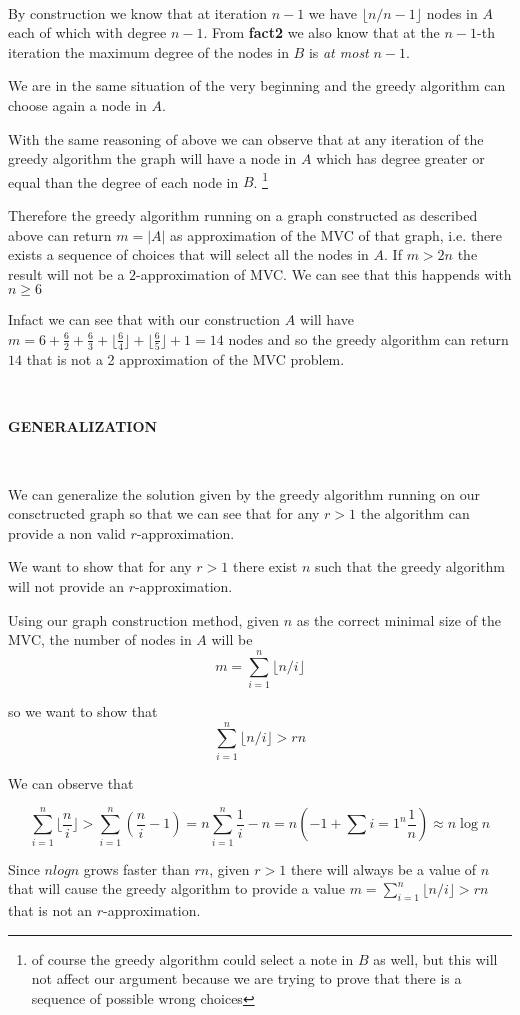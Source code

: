 \documentclass[a4paper]{article}
\begin{document}
\

By construction we know that at iteration $n-1$ we have $\lfloor n/n-1 \rfloor$ nodes in $A$ each of which with degree $n-1$.
From \textbf{fact2} we also know that at the $n-1$-th iteration the maximum degree of the nodes in $B$  is \emph{at most} $n-1$.

\noindent
We are in the same situation of the very beginning and the greedy algorithm can choose again a node in $A$.

With the same reasoning of above we can observe that at any iteration of the greedy algorithm the graph will have a node in $A$ which has degree greater or equal than the degree of each node in $B$. \footnote{of course the greedy algorithm could select a note in $B$ as well, but this will not affect our argument because we are trying to prove that there is a sequence of possible wrong choices}

Therefore the greedy algorithm running on a graph constructed as described above can return $m = |A|$ as approximation of the MVC of that graph, i.e. there exists a sequence of choices that will select all the nodes in $A$. 
If $m > 2n$ the result will not be a $2$-approximation of MVC.
We can see that this happends with $n \geq 6$

Infact we can see that with our construction $A$ will have $m = 6 + \frac{6}{2} + \frac{6}{3} + \lfloor \frac{6}{4} \rfloor +   \lfloor \frac{6}{5} \rfloor + 1 = 14$ nodes and so the greedy algorithm can return $14$ that is not a 2 approximation of the MVC problem.

\
\

\textbf{GENERALIZATION}

\
\

We can generalize the solution given by the greedy algorithm running on our consctructed graph so that we can see that for any $r > 1$ the algorithm can provide a non valid $r$-approximation.

We want to show that for any $r>1$ there exist $n$ such that the greedy algorithm will not provide an $r$-approximation.
 
Using our graph construction method, given $n$ as the correct minimal size of the MVC, the number of nodes in $A$ will be 
\[
m = \sum_{i=1}^n \lfloor n/i \rfloor
\]

so we want to show that 
\[
\sum_{i=1}^n \lfloor n/i \rfloor > rn
\]


We can observe that 

\[
\sum_{i=1}^n \lfloor \frac{n}{i} \rfloor > \sum_{i=1}^n (\frac{n}{i} - 1) = n \sum_{i=1}^n \frac{1}{i} - n = n(-1 + \sum{i=1}^n \frac{1}{n}) \approx n \log{n} 
\]

Since $nlogn$ grows faster than $rn$, given $r>1$ there will always be a value of $n$ that will cause the greedy algorithm to provide a value $m = \sum_{i=1}^n \lfloor n/i \rfloor > rn$ that is not an $r$-approximation.
\end{document}
